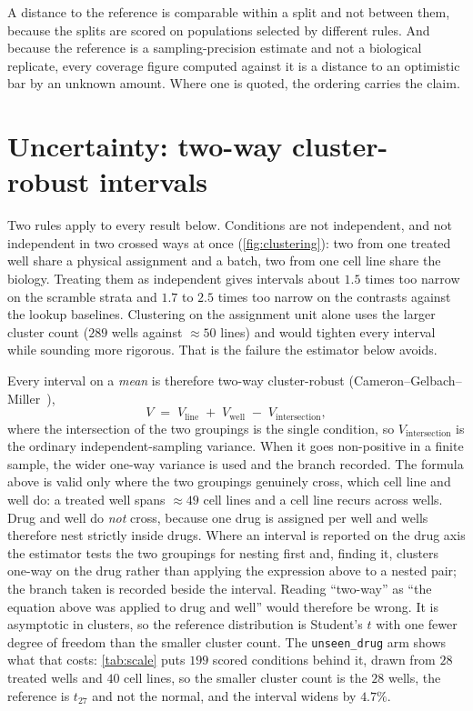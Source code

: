 \begin{scopelimit}
A distance to the reference is comparable within a split and not between them,
because the splits are scored on populations selected by different rules. And
because the reference is a sampling-precision estimate and not a biological
replicate, every coverage figure computed against it is a distance to an
optimistic bar by an unknown amount. Where one is quoted, the ordering carries
the claim.
\end{scopelimit}

\section{Uncertainty: two-way cluster-robust intervals}
\label{sec:apparatus-clusters}

Two rules apply to every result below.
Conditions are not independent, and not independent in two crossed ways at once
(\cref{fig:clustering}): two from one treated well share a physical assignment
and a batch, two from one cell line share the biology. Treating them as
independent gives intervals about $1.5$ times too narrow on the scramble
strata and $1.7$ to $2.5$ times too narrow on the contrasts against the lookup
baselines. Clustering on the assignment unit alone uses the larger cluster
count ($289$ wells against $\approx 50$ lines) and would tighten every interval
while sounding more rigorous. That is the failure the estimator below avoids.



Every interval on a \emph{mean} is therefore two-way cluster-robust (Cameron--Gelbach--Miller~\cite{cameron2011multiway}),
\begin{equation}
 V \;=\; V_{\textrm{line}} \;+\; V_{\textrm{well}} \;-\; V_{\textrm{intersection}},
\end{equation}
where the intersection of the two groupings is the single condition, so
$V_{\textrm{intersection}}$ is the ordinary independent-sampling variance. When
it goes non-positive in a finite sample, the wider one-way variance is used and
the branch recorded. The formula above is valid only where the two groupings
genuinely cross, which cell line and well do: a treated well spans
$\approx 49$ cell lines and a cell line recurs across wells. Drug and well do
\emph{not} cross, because one drug is assigned per well and wells therefore nest
strictly inside drugs. Where an interval is reported on the drug axis the
estimator tests the two groupings for nesting first and, finding it, clusters
one-way on the drug rather than applying the expression above to a nested pair;
the branch taken is recorded beside the interval. Reading ``two-way'' as
``the equation above was applied to drug and well'' would therefore be wrong.
It is asymptotic in clusters, so the reference distribution
is Student's $t$ with one fewer degree of freedom than the smaller cluster
count. The \texttt{unseen\_drug} arm shows what that costs: \cref{tab:scale}
puts $199$ scored conditions behind it, drawn from $28$ treated wells and $40$
cell lines, so the smaller cluster count is the $28$ wells, the reference is
$t_{27}$ and not the normal, and the interval widens by $4.7\%$.

